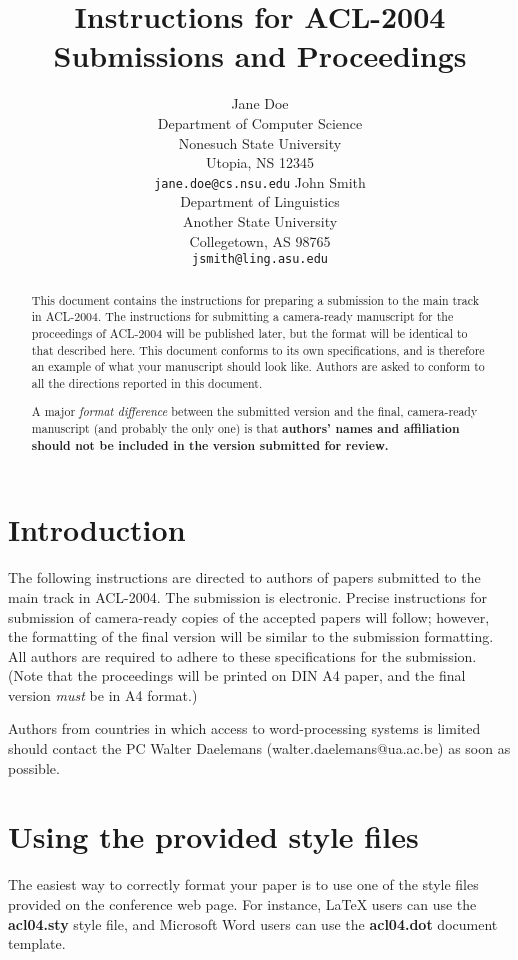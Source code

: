 \documentclass[11pt]{article}
\title{Instructions for ACL-2004 Submissions and Proceedings}
\author{Jane Doe\\
  Department of Computer Science \\
  Nonesuch State University \\
  Utopia, NS 12345 \\
  {\tt jane.doe@cs.nsu.edu} \And
  John Smith \\
  Department of Linguistics \\
  Another State University \\
  Collegetown, AS 98765 \\  
  {\tt jsmith@ling.asu.edu}}
\date{}
\begin{document}
\maketitle

\begin{abstract}
  This document contains the instructions for preparing a submission to the main
  track in ACL-2004.  The instructions for submitting a camera-ready
  manuscript for the proceedings of ACL-2004 will be published later, but
  the format will be identical to that described here.
  This document conforms
  to its own specifications, and is therefore an example of what
  your manuscript should look like.  Authors are asked to conform to
  all the directions reported in this document.
  
  A major {\em format difference} between the submitted version and the
  final, camera-ready manuscript (and probably the only one) is that {\bf
    authors' names and affiliation should not be included in the version
    submitted for review.}
\end{abstract}

\section{Introduction}

The following instructions are directed to authors of papers submitted to
the main track in ACL-2004.  The submission is electronic.  Precise
instructions for submission of camera-ready copies of the accepted papers
will follow; however, the formatting of the final version will be similar
to the submission formatting.  All authors are required to adhere to these
specifications for the submission.  (Note that the proceedings will be
printed on DIN A4 paper, and the final version {\em must}\/ be in A4
format.)

Authors from countries in which access to word-processing systems is
limited should contact the PC Walter Daelemans (walter.daelemans@ua.ac.be)
as soon as possible.

\section{Using the provided style files}

The easiest way to correctly format your paper is to use one of the
style files provided on the conference web page. For instance, \LaTeX{}
users can use the {\bf acl04.sty} style file, and Microsoft Word
users can use the {\bf acl04.dot} document template.
\end{document}
